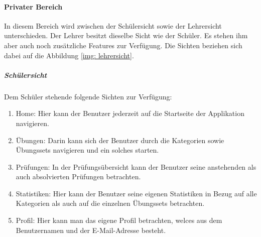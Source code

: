 \paragraph{Privater Bereich}
In diesem Bereich wird zwischen der Schülersicht sowie der Lehrersicht unterschieden.
Der Lehrer besitzt dieselbe Sicht wie der Schüler.
Es stehen ihm aber auch noch zusätzliche Features zur Verfügung.
Die Sichten beziehen sich dabei auf die Abbildung \ref{img: lehrersicht}.


\subparagraph{Schülersicht}
Dem Schüler stehende folgende Sichten zur Verfügung:
\begin{enumerate}
    \item Home: Hier kann der Benutzer jederzeit auf die Startseite der Applikation navigieren.
    \item Übungen: Darin kann sich der Benutzer durch die Kategorien sowie Übungssets navigieren und ein solches starten.
    \item Prüfungen: In der Prüfungsübersicht kann der Benutzer seine anstehenden als auch absolvierten Prüfungen betrachten.
    \item Statistiken: Hier kann der Benutzer seine eigenen Statistiken in Bezug auf alle Kategorien als auch auf die einzelnen Übungssets betrachten.
    \setcounter{enumi}{11}
    \item Profil: Hier kann man das eigene Profil betrachten, welces aus dem Benutzernamen und der E-Mail-Adresse besteht.
\end{enumerate}

